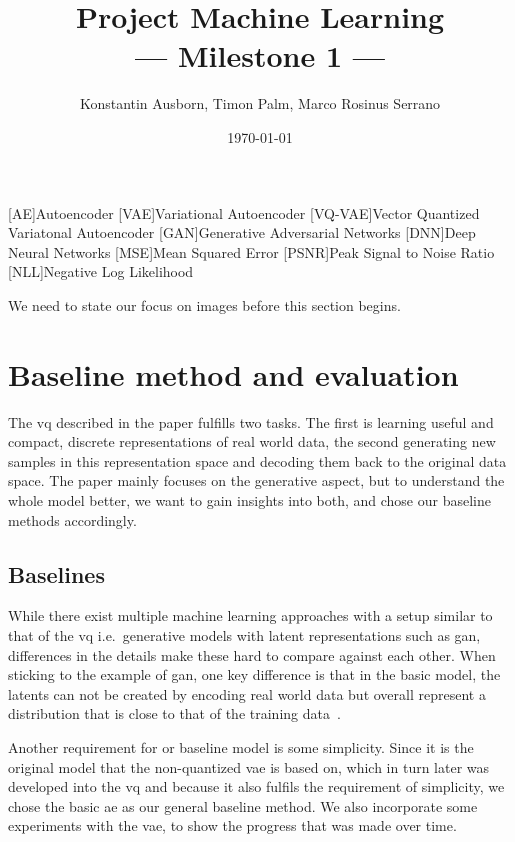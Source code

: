 \documentclass[10pt,a4paper,twoside]{article}
\title{Project Machine Learning\\--- Milestone 1 ---}
\author{Konstantin Ausborn, Timon Palm, Marco Rosinus Serrano}
\date{\today}
\begin{document}
    [AE]{Autoencoder}
    [VAE]{Variational Autoencoder}
    [VQ-VAE]{Vector Quantized Variatonal Autoencoder}
    [GAN]{Generative Adversarial Networks}
    [DNN]{Deep Neural Networks}
    [MSE]{Mean Squared Error}
    [PSNR]{Peak Signal to Noise Ratio}
    [NLL]{Negative Log Likelihood}

    \maketitle

    We need to state our focus on images before this section begins.

    \section{Baseline method and evaluation}\label{sec:baseline-method-and-evaluation}
    The \ac{vq} described in the paper fulfills two tasks.
    The first is learning useful and compact, discrete representations of real world data, the second generating new samples
    in this representation space and decoding them back to the original data space.
    The paper mainly focuses on the generative aspect, but to understand the whole model better, we want to gain insights
    into both, and chose our baseline methods accordingly.

    \subsection{Baselines}\label{subsec:baselines}
    While there exist multiple machine learning approaches with a setup similar to that of the \ac{vq}
    i.e.\ generative models with latent representations such as \ac{gan}, differences in the details make these hard to
    compare against each other.
    When sticking to the example of \ac{gan}, one key difference is that in the basic model, the latents can not be created
    by encoding real world data but overall represent a distribution that is close to that of the training data~\cite{gan}.

    Another requirement for or baseline model is some simplicity.
    Since it is the original model that the non-quantized \ac{vae} is based on, which in turn later was developed into the
    \ac{vq} and because it also fulfils the requirement of simplicity, we chose the basic \ac{ae} as our general baseline
    method.
    We also incorporate some experiments with the \ac{vae}, to show the progress that was made over time.
\end{document}
